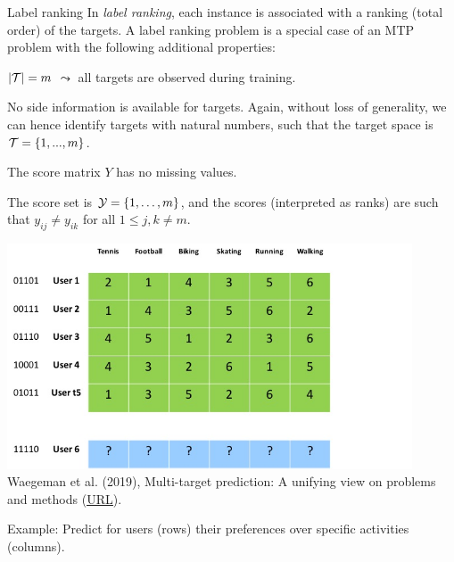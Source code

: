 \begin{frame}{Label ranking}
	\small
		In \emph{label ranking}, each instance is associated with a ranking (total order) of the targets.
		A label ranking problem is a special case of an MTP problem with the following additional properties: 
%		
		\begin{enumerate}\small
%			
			\item[P5] $|\mathcal{T}|=m$ $\leadsto$ all targets are observed during training. 
%			
			\item[P6] No side information is available for targets. Again, without loss of generality, we can hence identify targets with natural numbers, such that the target space is $\mathcal{T} = \{1,...,m\}$. 
			
			\item[]
			
			\begin{minipage}{0.5\textwidth}    
				\item[]
%				
			\item[P7] The score matrix $Y$ has no missing values. 
%			
			\item[P8c] The score set is $\mathcal{Y} = \{1, \ldots , m\}$, and the scores (interpreted as ranks) are such that $y_{ij} \neq y_{ik}$ for all $1 \leq j,k \neq m$. 
			\end{minipage}
			\begin{minipage}{0.4\textwidth}    
			\begin{center}
				\includegraphics[width=0.9\textwidth,trim = 0 0 100 0,clip]{figure/labelranking} \tiny
				\\ Waegeman et al. (2019), Multi-target prediction:
				A unifying view on problems and methods (\href{https://arxiv.org/pdf/1809.02352.pdf}{\underline{URL}}).
			\end{center}
		\end{minipage}
		\end{enumerate}
%	
	Example: Predict for users (rows) their preferences over specific activities (columns).
%	
\end{frame}


